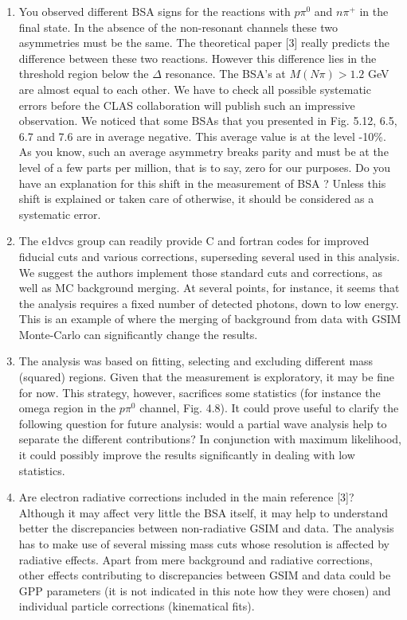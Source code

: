 \documentclass[11pt]{paper}
\begin{document}
\begin{enumerate}
\item You observed different BSA signs for the reactions with $p\pi^0$ and $n\pi^+$ in the final state.  
In the absence of the non-resonant channels these two asymmetries must be the same. 
The theoretical paper [3] really predicts the difference between these two reactions. 
However this difference lies in the threshold region below the $\Delta$ resonance. 
The BSA's  at $M(N\pi)>1.2$ GeV are almost equal to each other.
We have to check all possible systematic errors before the CLAS collaboration will publish such an impressive observation.  
We noticed that some BSAs that you presented in Fig. 5.12, 6.5, 6.7 and 7.6 are in average negative. 
This average value is at the level -10\%. 
As you know, such an average asymmetry breaks parity and must be at the level of a few parts per million, that is to say, zero for our purposes. 
Do you have an explanation for this shift in the measurement of BSA ?
Unless this shift is explained or taken care of otherwise, it should be considered as a systematic error.

\item The e1dvcs group can readily provide C and fortran codes for improved fiducial cuts and various corrections, superseding several used in this analysis.
We suggest the authors implement those standard cuts and corrections, as well as MC background merging.
At several points, for instance, it seems that the analysis requires a fixed number of detected photons, down to low energy.
This is an example of where the merging of background from data with GSIM Monte-Carlo can significantly change the results.

\item The analysis was based on fitting, selecting and excluding different mass (squared) regions.
Given that the measurement is exploratory, it may be fine for now.
This strategy, however, sacrifices some statistics (for instance the omega region in the 
$p\pi^0$ channel, Fig. 4.8).
It could prove useful to clarify the following question for future analysis: would a partial wave analysis help to separate the different contributions?
In conjunction with maximum likelihood, it could possibly improve the results significantly in dealing with low statistics.

\item Are electron radiative corrections included in the main reference [3]?
Although it may affect very little the BSA itself, it may help to understand better the discrepancies between non-radiative GSIM and data.
The analysis has to make use of several missing mass cuts whose resolution is affected by radiative effects.
Apart from mere background and radiative corrections, other effects contributing to discrepancies between GSIM and data could be GPP parameters 
(it is not indicated in this note how they were chosen) and individual particle corrections (kinematical fits).


\end{enumerate}
\end{document}

